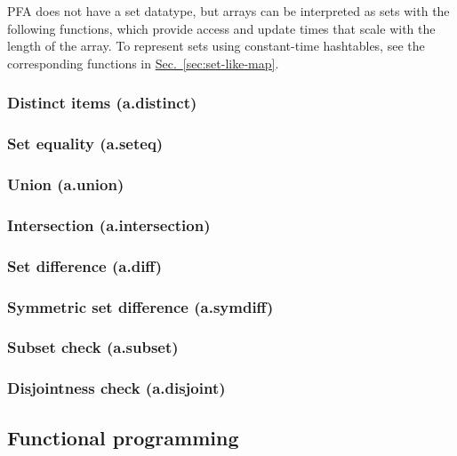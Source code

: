 \documentclass{article}
\theoremstyle{definition}
\begin{document}
PFA does not have a set datatype, but arrays can be interpreted as sets with the following functions, which provide access and update times that scale with the length of the array.  To represent sets using constant-time hashtables, see the corresponding functions in \hyperlink{hsec:set-like-map}{Sec.~\ref{sec:set-like-map}}.

\subsubsection{Distinct items (a.distinct)}

\subsubsection{Set equality (a.seteq)}

\subsubsection{Union (a.union)}

\subsubsection{Intersection (a.intersection)}

\subsubsection{Set difference (a.diff)}

\subsubsection{Symmetric set difference (a.symdiff)}

\subsubsection{Subset check (a.subset)}

\subsubsection{Disjointness check (a.disjoint)}

\subsection{Functional programming}
\end{document}
